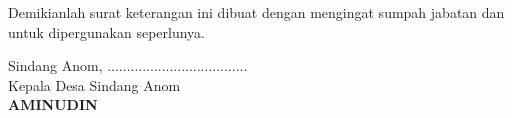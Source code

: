 \documentclass[a4paper, 12pt]{article}
\begin{document}
Demikianlah surat keterangan ini dibuat dengan mengingat sumpah jabatan dan untuk dipergunakan seperlunya.
\vspace{1.5cm}

\begin{flushright}
    Sindang Anom, .................................... \\
    Kepala Desa Sindang Anom \\
    \vspace{2.5cm} %
    \textbf{AMINUDIN} \\
\end{flushright}
\end{document}
